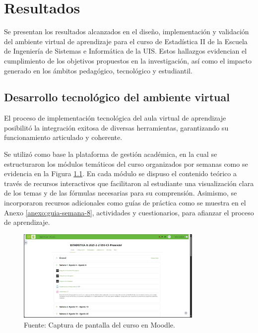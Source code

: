 \documentclass[letter,oneside,12pt,spanish]{report}
\begin{document}
\newpage

\chapter{Resultados}

Se presentan los resultados alcanzados en el diseño, implementación y validación del ambiente virtual de aprendizaje para el curso de Estadística II de la Escuela de Ingeniería de Sistemas e Informática de la UIS. Estos hallazgos evidencian el cumplimiento de los objetivos propuestos en la investigación, así como el impacto generado en los ámbitos pedagógico, tecnológico y estudiantil.

\section{Desarrollo tecnológico del ambiente virtual}

El proceso de implementación tecnológica del aula virtual de aprendizaje posibilitó la integración exitosa de diversas herramientas, garantizando su funcionamiento articulado y coherente.

Se utilizó como base la plataforma de gestión académica, en la cual se estructuraron los módulos temáticos del curso organizados por semanas como se evidencia en la Figura \ref{fig:Moodle}. En cada módulo se dispuso el contenido teórico a través de recursos interactivos que facilitaron al estudiante una visualización clara de los temas y de las fórmulas necesarias para su comprensión. Asimismo, se incorporaron recursos adicionales como guías de práctica como se muestra en el Anexo \ref{anexo:guia-semana-8}, actividades y cuestionarios, para afianzar el proceso de aprendizaje. 

\begin{figure}[ht]
	\centering
	\includegraphics[width=0.8\textwidth]{Figs/Moodle.pdf}
	\label{fig:Moodle}
	\\Fuente: Captura de pantalla del curso en Moodle.
\end{figure}
\end{document}
